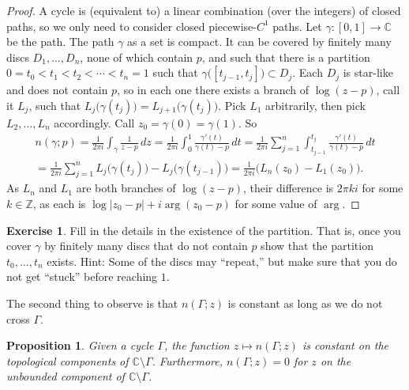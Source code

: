 \documentclass[12pt,openany]{book}
\newcommand{\sabs}[1]{\lvert {#1} \rvert}
\newcommand{\C}{{\mathbb{C}}}
\newcommand{\Z}{{\mathbb{Z}}}
\newcommand{\myquote}[1]{``#1''}
\theoremstyle{plain}
\newtheorem{prop}[thm]{Proposition}
\theoremstyle{remark}
\theoremstyle{definition}
\newenvironment{exbox}{%
    \def\FrameCommand{\vrule width 1pt \relax\hspace{10pt}}%
    \MakeFramed{\advance\hsize-\width\FrameRestore}%
}{%
    \endMakeFramed
}
\theoremstyle{exercise}
\newtheorem{exercise}{Exercise}[section]
\theoremstyle{example}
\begin{document}
\begin{proof}
A cycle is (equivalent to) a linear combination (over the integers) of closed paths,
so we only need to consider closed piecewise-$C^1$ paths.
Let $\gamma \colon [0,1] \to \C$ be the path.
The path $\gamma$ as a set is compact.  It can be covered by finitely many
discs $D_1,\ldots,D_n$, none of which contain $p$, and such that there is a
partition $0 = t_0 < t_1 < t_2 < \cdots < t_n = 1$ such that
$\gamma\bigl([t_{j-1},t_j]\bigr) \subset D_j$.  Each $D_j$ is star-like and
does not contain $p$,
so in each one there exists a branch of $\log (z-p)$, call it $L_j$,
such that $L_j\bigl(\gamma(t_j)\bigr) = L_{j+1}\bigl(\gamma(t_j)\bigr)$.
Pick $L_1$ arbitrarily, then pick $L_2,\ldots,L_n$ accordingly.
Call $z_0 = \gamma(0) = \gamma(1)$.  So
\begin{multline*}
n(\gamma;p)
=
\frac{1}{2\pi i} \int_\gamma \frac{1}{z-p} \, dz
=
\frac{1}{2\pi i} \int_0^1 \frac{\gamma'(t)}{\gamma(t)-p} \, dt
=
\frac{1}{2\pi i} \sum_{j=1}^n \int_{t_{j-1}}^{t_j} \frac{\gamma'(t)}{\gamma(t)-p} \, dt
\\
=
\frac{1}{2\pi i} \sum_{j=1}^n L_j\bigl(\gamma(t_j)\bigr) -
L_j\bigl(\gamma(t_{j-1})\bigr)
=
\frac{1}{2\pi i} \bigl( L_n(z_0) - L_1(z_0) \bigr) .
\end{multline*}
As $L_n$ and $L_1$ are both branches of $\log(z-p)$, their difference is
$2\pi k i$ for some $k \in \Z$, as each is
$\log\sabs{z_0-p} + i \arg (z_0-p)$ for some value of
$\arg$.
\end{proof}

\begin{exbox}
\begin{exercise}
Fill in the details in the existence of the partition.  That is, once you
cover $\gamma$ by finitely many discs that do not contain $p$ show that
the partition $t_0,\ldots,t_n$ exists.  Hint: Some of the discs may
\myquote{repeat,} but make sure that you do not get \myquote{stuck}
before reaching $1$.
\end{exercise}
\end{exbox}

The second thing to observe is that $n(\Gamma;z)$ is constant as long as we
do not cross $\Gamma$.

\begin{prop} \label{prop:windingconstant}
Given a cycle $\Gamma$,
the function $z \mapsto n(\Gamma;z)$ is constant on the
topological components of $\C \setminus \Gamma$.
Furthermore, $n(\Gamma;z) = 0$ for $z$ on the unbounded component
of $\C \setminus \Gamma$.
\end{prop}
\end{document}
